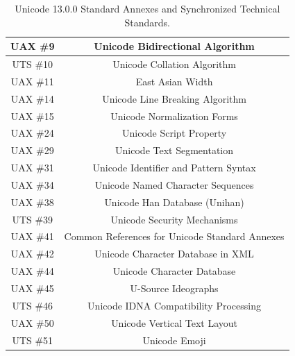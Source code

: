 \documentclass[letterpaper,10pt]{article}
\begin{document}
\begin{appendices}
\begin{table}[h]
\begin{center}
  \begin{tabular}{ |c|c| }
    \hline
    UAX \#9 & Unicode Bidirectional Algorithm \\
    \hline
    UTS \#10 & Unicode Collation Algorithm \\
    \hline
    UAX \#11 & East Asian Width \\
    \hline
    UAX \#14 & Unicode Line Breaking Algorithm \\
    \hline
    UAX \#15 & Unicode Normalization Forms \\
    \hline
    UAX \#24 & Unicode Script Property \\
    \hline
    UAX \#29 & Unicode Text Segmentation \\
    \hline
    UAX \#31 & Unicode Identifier and Pattern Syntax \\
    \hline
    UAX \#34 & Unicode Named Character Sequences \\
    \hline
    UAX \#38 & Unicode Han Database (Unihan) \\
    \hline
    UTS \#39 & Unicode Security Mechanisms \\
    \hline
    UAX \#41 & Common References for Unicode Standard Annexes \\
    \hline
    UAX \#42 & Unicode Character Database in XML \\
    \hline
    UAX \#44 & Unicode Character Database \\
    \hline
    UAX \#45 & U-Source Ideographs \\
    \hline
    UTS \#46 & Unicode IDNA Compatibility Processing \\
    \hline
    UAX \#50 & Unicode Vertical Text Layout \\
    \hline
    UTS \#51 & Unicode Emoji \\
    \hline
  \end{tabular}
\caption{Unicode 13.0.0 Standard Annexes and Synchronized Technical Standards.}
\end{center}
\end{table}

\cleardoublepage

%

\end{appendices}
\end{document}
